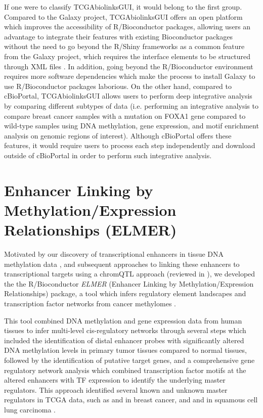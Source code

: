 If one were to classify TCGAbiolinksGUI, it would belong to the first group. Compared to the Galaxy project, TCGAbiolinksGUI offers an open platform which improves the accessibility of R/Bioconductor packages, allowing users an advantage to integrate their features with existing Bioconductor packages without the need to go beyond the R/Shiny frameworks as a common feature from the Galaxy project, which requires the interface elements to be structured through XML files \cite{10.12688/f1000research.9821.1}. 
In addition, going beyond the R/Bioconductor environment requires more software dependencies which make the process to install Galaxy to use R/Bioconductor packages laborious.
On the other hand, compared to cBioPortal, TCGAbiolinksGUI allows users to perform deep integrative analysis by comparing different subtypes of data (i.e. performing an integrative analysis to compare breast cancer samples with a mutation on FOXA1 gene compared to wild-type samples using DNA methylation, gene expression, and motif enrichment analysis on genomic regions of interest). Although cBioPortal offers these features, it would require users to process each step independently and download outside of cBioPortal in order to perform such integrative analysis.


\section{Enhancer Linking by Methylation/Expression Relationships (ELMER)}

Motivated by our discovery of transcriptional enhancers in tissue DNA methylation data \cite{berman2012ng}, and subsequent approaches to linking these enhancers to transcriptional targets using a chromQTL approach \cite{aran2013dna} (reviewed in ), we developed the the R/Bioconductor  \textit{ELMER} (Enhancer Linking by Methylation/Expression Relationships) package, a tool which infers regulatory element landscapes and transcription factor networks from cancer methylomes \cite{yao2015inferring}. 

This tool combined DNA methylation and gene expression data from human tissues to infer multi-level cis-regulatory networks through several steps which included the identification of distal enhancer probes with significantly altered DNA methylation levels in primary tumor tissues compared to normal tissues, followed by the identification of putative target genes, and a comprehensive gene regulatory network analysis which combined transcription factor motifs at the altered enhancers with TF expression to identify the underlying master regulators. This approach identified several known and unknown master regulators in TCGA data, such as  and  in breast cancer, and  and  in squamous cell lung carcinoma \cite{yao2015inferring,silva2016tcga}.

